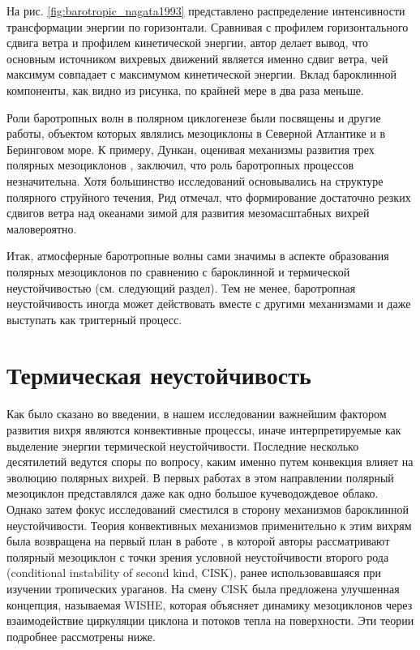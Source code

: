 На рис. \ref{fig:barotropic_nagata1993} представлено распределение интенсивности трансформации энергии по горизонтали. Сравнивая с профилем горизонтального сдвига ветра и профилем кинетической энергии, автор делает вывод, что основным источником вихревых движений является именно сдвиг ветра, чей максимум совпадает с максимумом кинетической энергии. Вклад бароклинной компоненты, как видно из рисунка, по крайней мере в два раза меньше.

Роли баротропных волн в полярном циклогенезе были посвящены и другие работы, объектом которых являлись мезоциклоны в Северной Атлантике и в Беринговом море. К примеру, Дункан, оценивая механизмы развития трех полярных мезоциклонов \citep{RT2003}, заключил, что роль баротропных процессов незначительна. Хотя большинство исследований основывались на структуре полярного струйного течения, Рид \citep{ReedDuncan1987} отмечал, что формирование достаточно резких сдвигов ветра над океанами зимой для развития мезомасштабных вихрей маловероятно.

Итак, атмосферные баротропные волны сами значимы в аспекте образования полярных мезоциклонов по сравнению с бароклинной и термической неустойчивостью (см. следующий раздел). Тем не менее, баротропная неустойчивость иногда может действовать вместе с другими механизмами и даже выступать как триггерный процесс.

\section{Термическая неустойчивость}
\label{sec:theory:cisk_wishe}
Как было сказано во введении, в нашем исследовании важнейшим фактором развития вихря являются конвективные процессы, иначе интерпретируемые как выделение энергии термической неустойчивости. Последние несколько десятилетий ведутся споры по вопросу, каким именно путем конвекция влияет на эволюцию полярных вихрей. В первых работах в этом направлении полярный мезоциклон представлялся даже как одно большое кучеводождевое облако. Однако затем фокус исследований сместился в сторону механизмов бароклинной неустойчивости. Теория конвективных механизмов применительно к этим вихрям была возвращена на первый план в работе \citep{Okland1987,Rasmussen1979}, в которой авторы рассматривают полярный мезоциклон с точки зрения условной неустойчивости второго рода (conditional instability of second kind, CISK), ранее использовавшаяся при изучении тропических ураганов. На смену CISK была предложена улучшенная концепция, называемая WISHE, которая объясняет динамику мезоциклонов через взаимодействие циркуляции циклона и потоков тепла на поверхности. Эти теории подробнее рассмотрены ниже.

